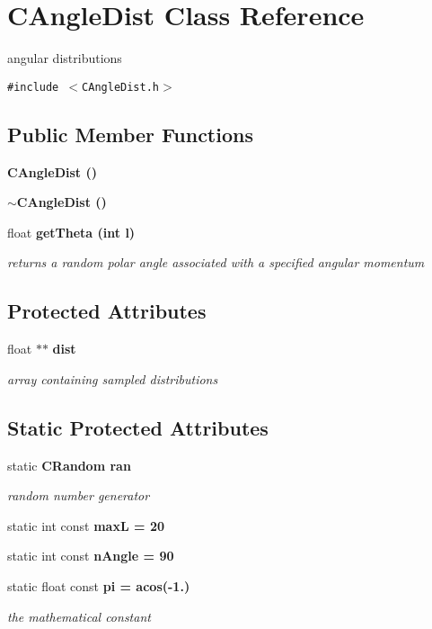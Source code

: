 \section{CAngle\-Dist Class Reference}
\label{classCAngleDist}
angular distributions  


{\tt \#include $<$CAngle\-Dist.h$>$}

\subsection*{Public Member Functions}
\begin{CompactItemize}
\item 
\bf{CAngle\-Dist} ()
\item 
\bf{$\sim$CAngle\-Dist} ()
\item 
float \bf{get\-Theta} (int l)
\begin{CompactList}\small\item\em returns a random polar angle associated with a specified angular momentum \item\end{CompactList}\end{CompactItemize}
\subsection*{Protected Attributes}
\begin{CompactItemize}
\item 
float $\ast$$\ast$ \bf{dist}\label{classCAngleDist_c77de26b9bad4663b58b4f8d1078c710}

\begin{CompactList}\small\item\em array containing sampled distributions \item\end{CompactList}\end{CompactItemize}
\subsection*{Static Protected Attributes}
\begin{CompactItemize}
\item 
static \bf{CRandom} \bf{ran}\label{classCAngleDist_5bcd7170b7fcbed8814bad810afc4e19}

\begin{CompactList}\small\item\em random number generator \item\end{CompactList}\item 
static int const \bf{max\-L} = 20
\item 
static int const \bf{n\-Angle} = 90
\item 
static float const \bf{pi} = acos(-1.)\label{classCAngleDist_37d74e9f70a3d094648c40d0da92b947}

\begin{CompactList}\small\item\em the mathematical constant \item\end{CompactList}\end{CompactItemize}


